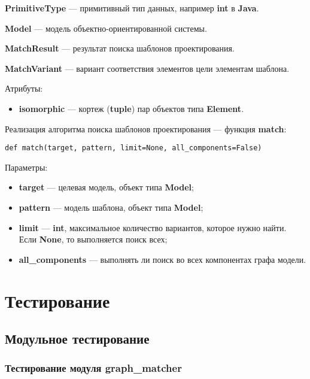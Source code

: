 \textbf{PrimitiveType} --- примитивный тип данных, например \textbf{int} в \textbf{Java}.

\textbf{Model} --- модель объектно-ориентированной системы.

\textbf{MatchResult} --- результат поиска шаблонов проектирования.

\textbf{MatchVariant} --- вариант соответствия элементов цели элементам шаблона.

Атрибуты:
\begin{itemize}
\item \textbf{isomorphic} --- кортеж (\textbf{tuple}) пар объектов типа \textbf{Element}.
\end{itemize}

Реализация алгоритма поиска шаблонов проектирования --- функция \textbf{match}:

\begin{verbatim}
def match(target, pattern, limit=None, all_components=False)
\end{verbatim}

Параметры:
\begin{itemize}
\item \textbf{target} --- целевая модель, объект типа \textbf{Model};
\item \textbf{pattern} --- модель шаблона, объект типа \textbf{Model};
\item \textbf{limit} --- \textbf{int}, максимальное количество
вариантов, которое нужно найти. Если \textbf{None}, то выполняется поиск всех;
\item \textbf{all\_components} --- выполнять ли поиск во всех компонентах графа
модели.
\end{itemize}

\section{Тестирование}

\subsection{Модульное тестирование}

\subsubsection{Тестирование модуля graph\_matcher}

